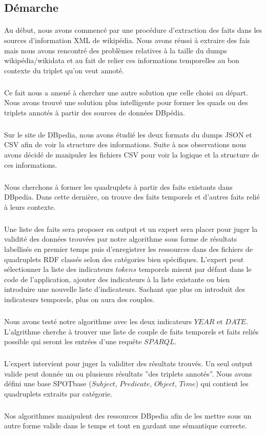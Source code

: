 \subsection*{Démarche}
\paragraph{}
Au début, nous avons commencé par une procédure d’extraction des faits dans les sources d'information XML de wikipédia. Nous avons réussi à extraire des fais mais nous avons rencontré des problèmes relatives à la taille du dumps wikipédia/wikidata et au fait de relier ces informations temporelles au bon contexte du triplet qu’on veut annoté.
\subparagraph{}
Ce fait nous a amené à chercher une autre solution que celle choisi au départ.
Nous avons trouvé une solution plus intelligente pour former les quads ou des triplets annotés à partir des sources de données DBpédia.
\subparagraph{}
Sur le site de DBpedia, nous avons étudié les deux formats du dumps JSON et CSV afin de voir la structure des informations.
Suite à nos observations nous avons décidé de manipuler les fichiers CSV pour voir la logique et la structure de ces informations.
\subparagraph{}
Nous cherchons à former les quadruplets à partir des faits existants dans DBpedia.
Dans cette dernière, on trouve des faits temporels et d’autres faits relié à leurs contexte.
\subparagraph{}
Une liste des faits sera proposer en output et un expert sera placer pour juger la validité des données trouvées par notre algorithme sous forme de résultats labellisés en premier temps puis d'enregistrer les ressources dans des fichiers de quadruplets RDF classés selon des catégories bien spécifiques.
L’expert peut sélectionner la liste des indicateurs $tokens$ temporels misent par défaut dans le code de l’application, ajouter des indicateurs à la liste existante ou bien introduire une nouvelle liste d’indicateurs.
Sachant que plus on introduit des indicateurs temporels, plus on aura des couples.
\subparagraph{}
Nous avons testé notre algorithme avec les deux indicateurs $YEAR$ et $DATE$.
L'algrithme cherche à trouver une liste de couple de faits temporels et faits reliés possible qui seront les entrées d'une requête $SPARQL$.
\subparagraph{}
L'expert intervient pour juger la validiter des résultats trouvés.
Un seul output valide peut donnée un ou plusieurs résultats ''des triplets annotés''.
Nous avons défini une base SPOTbase ($Subject$, $Predicate$, $Object$, $Time$) qui contient les quadruplets extraits par catégorie.
\subparagraph{}
Nos algorithmes manipulent des ressources DBpedia afin de les mettre sous un autre forme valide dans le temps et tout en gardant une sémantique correcte. 
